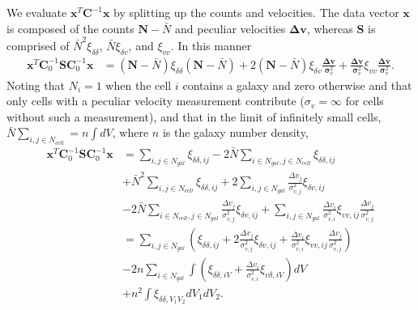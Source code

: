 \documentclass{article}
\begin{document}
We evaluate $\textbf{x}^T \textbf{C}^{-1}\textbf{x}$ by splitting up the counts and velocities.  The data vector $\textbf{x}$ is composed of the counts
 $\textbf{N}-\bar{N}$ and peculiar velocities $\mathbf{\Delta v}$, whereas $\textbf{S}$ is comprised of $\bar{N}^2\xi_{\delta\delta}$, $\bar{N}\xi_{\delta v}$,
and $\xi_{vv}$.  In this manner
\begin{align}
\textbf{x}^T \textbf{C}_0^{-1}\textbf{S}\textbf{C}_0^{-1} \textbf{x}& = (\textbf{N}-\bar{N}) \xi_{\delta\delta}  (\textbf{N}-\bar{N})  + 2  (\textbf{N}-\bar{N}) \xi_{\delta v}\frac{\mathbf{\Delta v}}{\bm{\sigma}_v^2}+ 
\frac{\mathbf{\Delta v}}{\bm{\sigma}_v^2} \xi_{vv}\frac{\mathbf{\Delta v}}{\bm{\sigma}_v^2}.
\end{align}
Noting that $N_i=1$ when the cell $i$ contains a galaxy and zero otherwise and that only cells with a peculiar velocity measurement contribute ($\sigma_v =\infty$
for cells without such a measurement), and that in the limit of infinitely small cells, $\bar{N}\sum_{i,j\in N_{cell}} = n \int dV$, where $n$ is the galaxy number density,
\begin{align*}
\textbf{x}^T \textbf{C}_0^{-1}\textbf{S}\textbf{C}_0^{-1} \textbf{x}& = \sum_{i,j\in N_{gal}} \xi_{\delta\delta,ij} -2 \bar{N} \sum_{i\in N_{gal},j\in N_{cell}} \xi_{\delta\delta,ij}\\
& +\bar{N}^2  \sum_{i,j\in N_{cell}}  \xi_{\delta\delta,ij} + 2 \sum_{i,j\in N_{gal}} \frac{\Delta v_j}{\sigma_{v,j}^2} \xi_{\delta v,ij} \\
& -2\bar{N}\sum_{i\in N_{cell}, j\in N_{gal}} \frac{\Delta v_j}{\sigma_{v,j}^2} \xi_{\delta v,ij}  + \sum_{i,j\in N_{gal}} \frac{\Delta v_i}{\sigma_{v,i}^2} \xi_{vv,ij} \frac{\Delta v_j}{\sigma_{v,j}^2}\\
& = \sum_{i,j\in N_{gal}} \left( \xi_{\delta\delta,ij} + 2  \frac{\Delta v_j}{\sigma_{v,j}^2} \xi_{\delta v,ij} + \frac{\Delta v_i}{\sigma_{v,i}^2} \xi_{vv,ij} \frac{\Delta v_j}{\sigma_{v,j}^2}\right)\\
&-2 n \sum_{i\in N_{gal}}\int \left(\xi_{\delta\delta,iV} + \frac{\Delta v_i}{\sigma_{v,i}^2} \xi_{v \delta,iV}\right) dV\\
& +n^2  \int \xi_{\delta\delta,V_1V_2}dV_1dV_2.
\end{align*}
\end{document}
